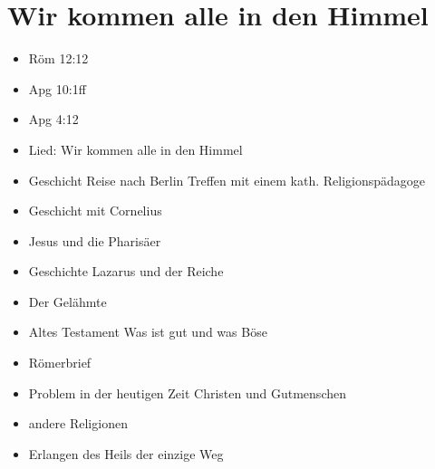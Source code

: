 \documentclass[12pt]{../../inc/mybib}
\author{Lothar Schmid}
\begin{document}
\setlength{\baselineskip}{1.5\baselineskip}
\section{Wir kommen alle in den Himmel}
\begin{otsblock}[Bibelstellen]
    \begin{itemize}
        \item Röm 12:12
        \item Apg 10:1ff
        \item Apg 4:12
    \end{itemize}
\end{otsblock}

\begin{itemize}
    \item Lied: Wir kommen alle in den Himmel
    \item Geschicht Reise nach Berlin Treffen mit einem kath. Religionspädagoge
    \item Geschicht mit Cornelius
    \item Jesus und die Pharisäer
    \item Geschichte Lazarus und der Reiche
    \item Der Gelähmte
    \item Altes Testament Was ist gut und was Böse
    \item Römerbrief
    \item Problem in der heutigen Zeit Christen und Gutmenschen
    \item andere Religionen
    \item Erlangen des Heils der einzige Weg
\end{itemize}
\end{document}
